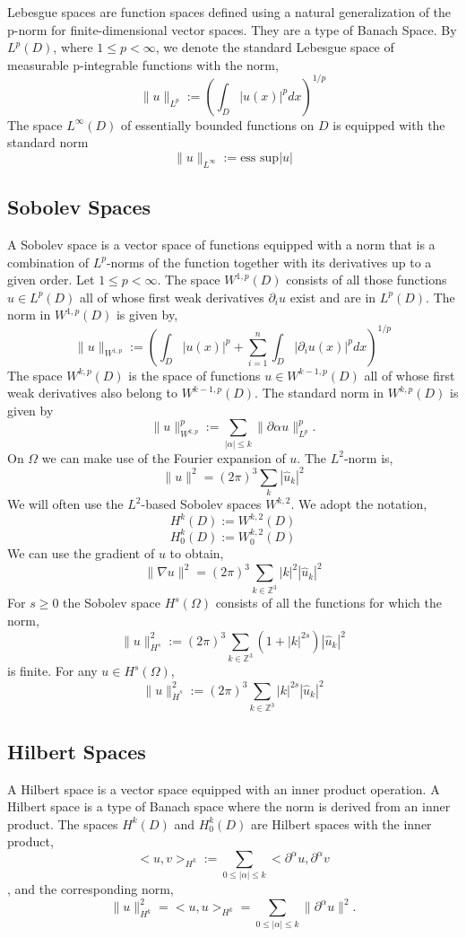 \documentclass[12pt]{article}
\begin{document}
\begin{flushleft}
\qquad Lebesgue spaces are function spaces defined using a natural generalization of the p-norm for finite-dimensional vector spaces. They are a type of Banach Space. By $L^p(D)$, where $1\leq p < \infty$, we denote the standard Lebesgue space of measurable p-integrable functions with the norm, 
$$\|u\|_{L^p} := \left( \int_D |u(x)|^p dx \right)^{1/p}$$
The space $L^\infty(D)$ of essentially bounded functions on $D$ is equipped with the standard norm
$$\|u\|_{L^\infty} := \text{ess sup}|u|$$

\subsection{Sobolev Spaces}

\qquad A Sobolev space is a vector space of functions equipped with a norm that is a combination of $L^p$-norms of the function together with its derivatives up to a given order. Let $1\leq p <\infty$. The space $W^{1,p}(D)$ consists of all those functions $u\in L^p(D)$ all of whose first weak derivatives $\partial_i u$ exist and are in $L^p(D)$. The norm in $W^{1,p}(D)$ is given by,
$$\|u\|_{W^{1,p}} := \left( \int_D |u(x)|^p + \sum_{i=1}^n \int_D |\partial_i u(x)|^p dx \right)^{1/p}$$
The space $W^{k,p}(D)$ is the space of functions $u\in W^{k-1,p}(D)$ all of whose first weak derivatives also belong to $W^{k-1,p}(D)$. The standard norm in $W^{k,p}(D)$ is given by
$$\|u\|_{W^{k,p}}^p := \sum_{|\alpha|\leq k}\|\partial \alpha u\|_{L^p}^p.$$
On $\Omega$ we can make use of the Fourier expansion of $u$. The $L^2$-norm is,
$$\|u\|^2 = (2\pi)^3\sum_k|\hat{u}_k|^2$$
We will often use the $L^2$-based Sobolev spaces $W^{k,2}$. We adopt the notation,
$$H^k(D) := W^{k,2}(D)$$
$$H_0^k(D) := W_0^{k,2}(D)$$
We can use the gradient of $u$ to obtain,
$$\|\nabla u\|^2 = (2\pi)^3\sum_{k\in \mathbb{Z}^3}|k|^2|\hat{u}_k|^2$$
For $s\geq 0$ the Sobolev space $H^s(\Omega)$ consists of all the functions for which the norm,
$$\|u\|_{H^s}^2 := (2\pi)^3\sum_{k\in\mathbb{Z}^3}(1+|k|^{2s})|\hat{u}_k|^2$$
is finite. For any $u\in H^s(\Omega)$,
$$\|u\|_{\dot{H}^s}^2 := (2\pi)^3 \sum_{k\in\mathbb{Z}^3}|k|^{2s}|\hat{u}_k|^2$$

\subsection{Hilbert Spaces}

\qquad A Hilbert space is a vector space equipped with an inner product operation. A Hilbert space is a type of Banach space where the norm is derived from an inner product. The spaces $H^k(D)$ and $H_0^k(D)$ are Hilbert spaces with the inner product,
$$<u,v>_{H^k} := \sum_{0\leq |\alpha|\leq k}<\partial^\alpha u, \partial^\alpha v$$,
and the corresponding norm,
$$\|u\|_{H^k}^2 = <u,u>_{H^k} = \sum_{0\leq |\alpha|\leq k}\|\partial^\alpha u\|^2.$$


\end{flushleft}
\end{document}
